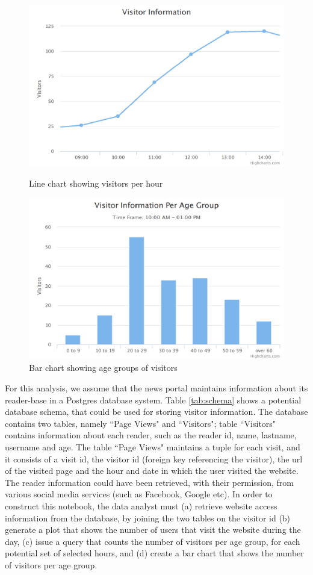 \begin{figure}[ht]
  \centering
  \includegraphics[width=0.8\columnwidth]{figures/first-line.png}
  \caption{Line chart showing visitors per hour}
\label{figure:first-running-example:first-line-chart}
   \vspace*{0.1cm}
  \includegraphics[width=0.8\columnwidth]{figures/first-bar.png}
  \caption{Bar chart showing age groups of visitors}
  \label{figure:first-running-example:first-bar-chart}
\end{figure}



For this analysis, we assume that the news portal maintains information about its reader-base in a Postgres database system. Table \ref{tab:schema} shows a potential database schema, that could be used for storing visitor information. The database contains two tables, namely ``Page Views" and ``Visitors"; table ``Visitors" contains information about each reader, such as the reader id, name, lastname, username and age. The table ``Page Views" maintains a tuple for each visit, and it consists of a visit id, the visitor id (foreign key referencing the visitor), the url of the visited page and the hour and date in which the user visited the website. The reader information could have been retrieved, with their permission, from various social media services (such as Facebook, Google etc). In order to construct this notebook, the data analyst must (a) retrieve  website access information from the database, by joining the two tables on the visitor id (b) generate a plot that shows the number of users that visit the website during the day, (c) issue a query that counts the number of visitors per age group, for each potential set of selected hours, and (d) create a bar chart that shows the number of visitors per age group. 


